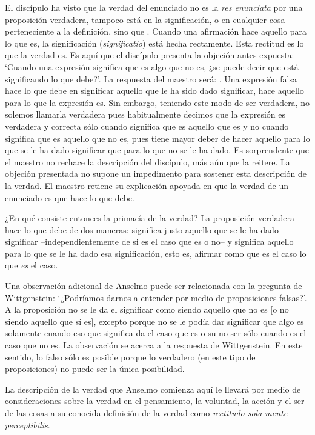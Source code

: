 El discípulo ha visto que la verdad del enunciado no es la \emph{res enunciata}
por una proposición verdadera, tampoco está en la significación, o en cualquier
cosa perteneciente a la definición, sino que .
Cuando una afirmación hace aquello para lo que es, la significación
(\emph{significatio}) está hecha rectamente. Esta rectitud es lo que la verdad
es. Es aquí que el discípulo presenta la objeción antes expuesta: `Cuando una
expresión significa que es algo que no es, ¿se puede decir que está significando
lo que debe?'. La respuesta del maestro será: . Una expresión falsa hace lo que
debe en significar aquello que le ha sido dado significar, hace aquello para lo
que la expresión es. Sin embargo, teniendo este modo de ser verdadera, no
solemos llamarla verdadera pues habitualmente decimos que la expresión es
verdadera y correcta sólo cuando significa que es aquello que es y no cuando
significa que es aquello que no es, pues tiene mayor deber de hacer aquello para
lo que se le ha dado significar que para lo que no se le ha dado. Es
sorprendente que el maestro no rechace la descripción del discípulo, más aún que
la reitere. La objeción presentada no supone un impedimento para sostener esta
descripción de la verdad. El maestro retiene su explicación apoyada en que la
verdad de un enunciado es que hace lo que debe.

¿En qué consiste entonces la primacía de la verdad? La proposición verdadera
hace lo que debe de dos maneras: significa justo aquello que se le ha dado
significar --independientemente de si es el caso que es o no-- y significa
aquello para lo que se le ha dado esa significación, esto es, afirmar como que
es el caso lo que \emph{es} el caso.

Una observación adicional de Anselmo puede ser relacionada con la pregunta de
Wittgenstein: `¿Podríamos darnos a entender por medio de proposiciones falsas?'.
A la proposición no se le da el significar como siendo aquello que no es [o no
siendo aquello que sí es], excepto porque no se le podía dar significar que algo
es solamente cuando eso que significa da el caso que es o su no ser sólo cuando
es el caso que no es. La observación se acerca a la respuesta de Wittgenstein.
En este sentido, lo falso sólo es posible porque lo verdadero (en este tipo de
proposiciones) no puede ser la única posibilidad.

La descripción de la verdad que Anselmo comienza aquí le llevará por medio de
consideraciones sobre la verdad en el pensamiento, la voluntad, la acción y el
ser de las cosas a su conocida definición de la verdad como \emph{rectitudo sola
  mente perceptibilis}.
